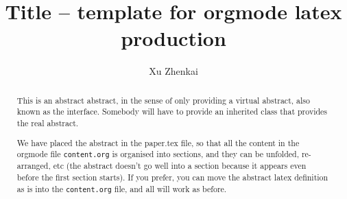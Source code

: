 \documentclass{article}
\title{\sffamily \textbf{Title -- template for orgmode latex production}}
\author{Xu Zhenkai}
\begin{document}
\maketitle

\begin{abstract}
  This is an abstract abstract, in the sense of only providing a
  virtual abstract, also known as the interface. Somebody will have to
  provide an inherited class that provides the real abstract.

  We have placed the abstract in the paper.tex file, so that all the
  content in the orgmode file \texttt{content.org} is organised into
  sections, and they can be unfolded, re-arranged, etc (the abstract
  doesn't go well into a section because it appears even before the
  first section starts). If you prefer, you can move the abstract
  latex definition as is into the \texttt{content.org} file, and all
  will work as before.
\end{abstract}







\end{document}
